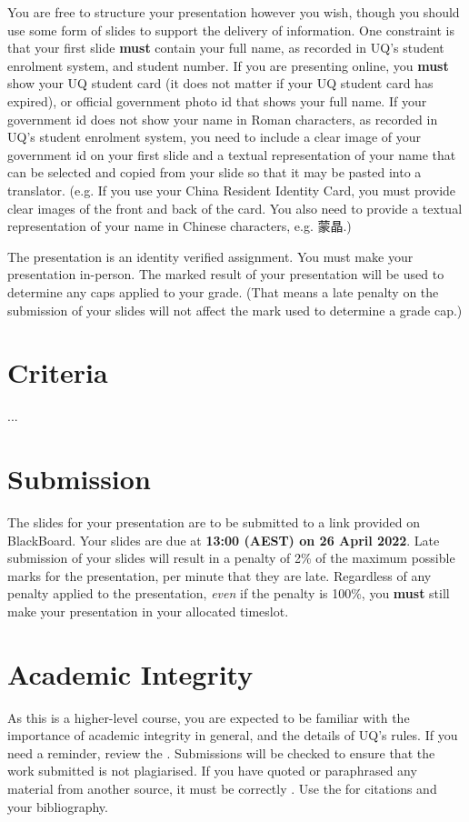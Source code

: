 \documentclass{csse4400}
\begin{document}
\begin{CJK*}{UTF8}{gbsn}
You are free to structure your presentation however you wish, though you should use some form of slides to support the delivery of information.
One constraint is that your first slide \textbf{must} contain your full name, as recorded in UQ's student enrolment system, and student number.
If you are presenting online, you \textbf{must} show your UQ student card (it does not matter if your UQ student card has expired),
or official government photo id that shows your full name. If your government id does not show your name in Roman characters,
as recorded in UQ's student enrolment system, you need to include a clear image of your government id on your first slide and a textual
representation of your name that can be selected and copied from your slide so that it may be pasted into a translator.
(e.g. If you use your China Resident Identity Card, you must provide clear images of the front and back
of the card. You also need to provide a textual representation of your name in Chinese characters, e.g. 蒙晶.)
\end{CJK*}

The presentation is an identity verified assignment.
You must make your presentation in-person.
The marked result of your presentation will be used to determine any caps applied to your grade.
(That means a late penalty on the submission of your slides will not affect the mark used to determine a grade cap.)


\section{Criteria}
...


\section{Submission}
The slides for your presentation are to be submitted to a link provided on BlackBoard.
Your slides are due at \textbf{13:00 (AEST) on 26 April 2022}.
Late submission of your slides will result in a penalty of 2\% of the maximum possible marks for the presentation, per minute that they are late.
Regardless of any penalty applied to the presentation, \emph{even} if the penalty is 100\%,
you \textbf{must} still make your presentation in your allocated timeslot.


\section{Academic Integrity}
As this is a higher-level course, you are expected to be familiar with the importance of academic integrity in general, and the details of UQ's rules.
If you need a reminder, review the .
Submissions will be checked to ensure that the work submitted is not plagiarised.
If you have quoted or paraphrased any material from another source, it must be correctly .
Use the  for citations and your bibliography.
\end{document}
